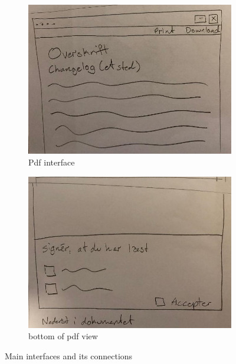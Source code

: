 \begin{figure}[H]\ContinuedFloat
		\centering
		\begin{subfigure}[b]{0.48\textwidth}
			\includegraphics[width=\textwidth]{billeder/pdf-view.jpg}
			\caption{Pdf interface}
			\label{fig:1-pdf}
		\end{subfigure}
		\quad
		\begin{subfigure}[b]{0.48\textwidth}
			\includegraphics[width=\textwidth]{billeder/bottom-pdf-view.jpg}
			\caption{bottom of pdf view}
			\label{fig:1-bottom-pdf}
		\end{subfigure}
		\caption{Main interfaces and its connections}\label{fig:1-MainPages}
\end{figure}

